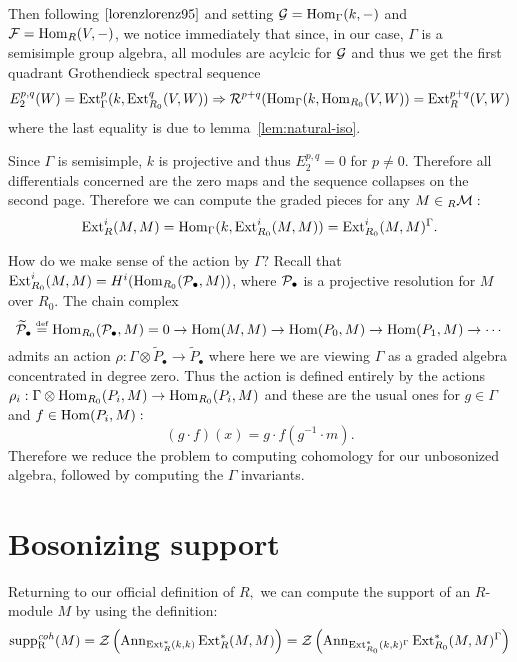 \documentclass [11pt, proquest] {uwthesis}[2020/02/24]
\DeclareMathOperator{\suppc}{supp^\mathit{coh}_R}
\begin{document}
    Then following $\cite[p.36]{lorenzlorenz95}$ and setting $\mathcal{G}=\operatorname{Hom}_\Gamma(k,-)$ and $\mathcal{F}=\operatorname{Hom}_{R}(V,-)$, we notice immediately that since, in our case, $\Gamma$ is a semisimple group algebra, all modules are acylcic for $\mathcal{G}$ and thus we get the first quadrant Grothendieck spectral sequence
    \[E_2^{p,q}(W)=\operatorname{Ext}^p_\Gamma(k,\operatorname{Ext}_{R_0}^q(V,W))\Rightarrow \mathcal{R}^{p+q}(\operatorname{Hom}_\Gamma(k,\operatorname{Hom}_{R_0}(V,W))=\operatorname{Ext}^{p+q}_R(V,W)\]
    where the last equality is due to lemma~\ref{lem:natural-iso}.
    
    Since $\Gamma$ is semisimple, $k$ is projective and thus $E_2^{p,q}=0$ for $p\ne 0.$ Therefore all differentials concerned are the zero maps and the sequence collapses on the second page. Therefore we can compute the graded pieces for any $M\in{_R\mathcal{M}}:$
    \[\operatorname{Ext}_R^i(M,M)=\operatorname{Hom}_\Gamma(k, \operatorname{Ext}^i_{R_0}(M,M))=\operatorname{Ext}^i_{R_0}(M,M)^\Gamma.\]
    
    How do we make sense of the action by $\Gamma?$ Recall that $\operatorname{Ext}^i_{R_0}(M,M)=H^i(\operatorname{Hom}_{R_0}(\mathcal{P}_\bullet,M))$, where $\mathcal{P}_\bullet$ is a projective resolution for $M$ over $R_0.$ The chain complex
    \[\widetilde{\mathcal{P}}_\bullet\stackrel{\text{\tiny def}}{=}\operatorname{Hom}_{R_0}(\mathcal{P}_\bullet,M)=0\to\operatorname{Hom}(M,M)\to \operatorname{Hom}(P_0,M)\to\operatorname{Hom}(P_1,M)\to \cdots\]
    admits an action $\rho:\Gamma\otimes\tilde P_\bullet\to\tilde P_\bullet$ where here we are viewing $\Gamma$ as a graded algebra concentrated in degree zero. Thus the action is defined entirely by the actions $\rho_i:\Gamma\otimes\operatorname{Hom}_{R_0}(P_i,M)\to \operatorname{Hom}_{R_0}(P_i,M)$ and these are the usual ones for $g\in\Gamma$ and $f\in\operatorname{Hom}(P_i,M):$
    \[(g\cdot f)(x)=g\cdot f(g^{-1}\cdot m).\]
    Therefore we reduce the problem to computing cohomology for our unbosonized algebra, followed by computing the $\Gamma$ invariants. 
    
\section{Bosonizing support}
    Returning to our official definition of $R,$ we can compute the support of an $R$-module $M$ by using the definition:
    \[\suppc(M)=\calZ\left(\operatorname{Ann}_{\Ext^\ast_R(k,k)}\Ext_R^\ast(M,M)\right)=\calZ\left(\operatorname{Ann}_{\Ext^\ast_{R_0}(k,k)^\Gamma}\Ext_{R_0}^\ast(M,M)^\Gamma\right)\]
\end{document}
